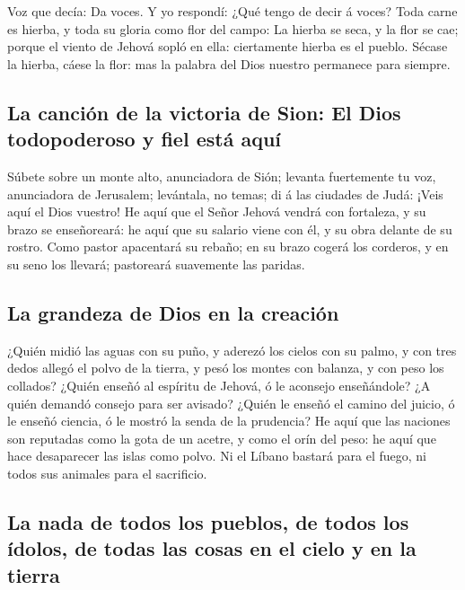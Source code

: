  Voz que decía: Da voces. Y yo respondí: ¿Qué tengo de
decir á voces? Toda carne es hierba, y toda su gloria como flor del
campo:  La hierba se seca, y la flor se cae; porque el
viento de Jehová sopló en ella: ciertamente hierba es el pueblo.
 Sécase la hierba, cáese la flor: mas la palabra del Dios
nuestro permanece para siempre.

\hypertarget{la-canciuxf3n-de-la-victoria-de-sion-el-dios-todopoderoso-y-fiel-estuxe1-aquuxed}{%
\subsection{La canción de la victoria de Sion: El Dios todopoderoso y
fiel está
aquí}\label{la-canciuxf3n-de-la-victoria-de-sion-el-dios-todopoderoso-y-fiel-estuxe1-aquuxed}}

 Súbete sobre un monte alto, anunciadora de Sión; levanta
fuertemente tu voz, anunciadora de Jerusalem; levántala, no temas; di á
las ciudades de Judá: ¡Veis aquí el Dios vuestro!  He
aquí que el Señor Jehová vendrá con fortaleza, y su brazo se
enseñoreará: he aquí que su salario viene con él, y su obra delante de
su rostro.  Como pastor apacentará su rebaño; en su brazo
cogerá los corderos, y en su seno los llevará; pastoreará suavemente las
paridas.

\hypertarget{la-grandeza-de-dios-en-la-creaciuxf3n}{%
\subsection{La grandeza de Dios en la
creación}\label{la-grandeza-de-dios-en-la-creaciuxf3n}}

 ¿Quién midió las aguas con su puño, y aderezó los cielos
con su palmo, y con tres dedos allegó el polvo de la tierra, y pesó los
montes con balanza, y con peso los collados?  ¿Quién
enseñó al espíritu de Jehová, ó le aconsejo enseñándole? 
¿A quién demandó consejo para ser avisado? ¿Quién le enseñó el camino
del juicio, ó le enseñó ciencia, ó le mostró la senda de la prudencia?
 He aquí que las naciones son reputadas como la gota de
un acetre, y como el orín del peso: he aquí que hace desaparecer las
islas como polvo.  Ni el Líbano bastará para el fuego, ni
todos sus animales para el sacrificio.

\hypertarget{la-nada-de-todos-los-pueblos-de-todos-los-uxeddolos-de-todas-las-cosas-en-el-cielo-y-en-la-tierra}{%
\subsection{La nada de todos los pueblos, de todos los ídolos, de todas
las cosas en el cielo y en la
tierra}\label{la-nada-de-todos-los-pueblos-de-todos-los-uxeddolos-de-todas-las-cosas-en-el-cielo-y-en-la-tierra}}

